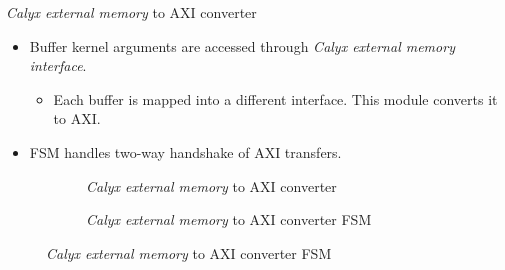 \documentclass[8pt,a4paper,oneside,hidelinks,aspectratio=169,dvipsnames]{beamer}
\begin{document}
\begin{frame}{\textit{Calyx external memory} to AXI converter}
  \begin{itemize}
    \item Buffer kernel arguments are accessed through \textit{Calyx external memory interface}.
          \begin{itemize}
            \item Each buffer is mapped into a different interface. This module converts it to AXI.
          \end{itemize}
    \item FSM handles two-way handshake of AXI transfers.
  \end{itemize}
  \begin{figure}[H]
    \begin{minipage}[H]{\textwidth}
      \centering
      \begin{subfigure}[t]{.45\textwidth}
        \centering
        \scalebox{.6}{}
        \caption{\textit{Calyx external memory} to AXI converter}
      \end{subfigure}
      \begin{subfigure}[t]{.45\textwidth}
        \centering
        \scalebox{.5}{}
        \caption{\textit{Calyx external memory} to AXI converter FSM}
      \end{subfigure}
    \end{minipage}
  \end{figure}
\end{frame}
\end{document}
